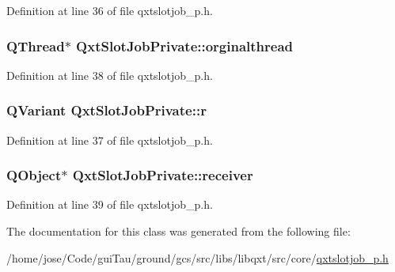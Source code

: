 Definition at line 36 of file qxtslotjob\-\_\-p.\-h.

\hypertarget{class_qxt_slot_job_private_a84859f360af208bb366408fadc1f0a4a}{
\subsubsection[{orginalthread}]{\setlength{\rightskip}{0pt plus 5cm}Q\-Thread$\ast$ Qxt\-Slot\-Job\-Private\-::orginalthread}}\label{class_qxt_slot_job_private_a84859f360af208bb366408fadc1f0a4a}


Definition at line 38 of file qxtslotjob\-\_\-p.\-h.

\hypertarget{class_qxt_slot_job_private_a39930b4d6454334df4d35a36727cf7c5}{
\subsubsection[{r}]{\setlength{\rightskip}{0pt plus 5cm}Q\-Variant Qxt\-Slot\-Job\-Private\-::r}}\label{class_qxt_slot_job_private_a39930b4d6454334df4d35a36727cf7c5}


Definition at line 37 of file qxtslotjob\-\_\-p.\-h.

\hypertarget{class_qxt_slot_job_private_a9b3127524a9fd9fe6802b820a5cef49d}{
\subsubsection[{receiver}]{\setlength{\rightskip}{0pt plus 5cm}Q\-Object$\ast$ Qxt\-Slot\-Job\-Private\-::receiver}}\label{class_qxt_slot_job_private_a9b3127524a9fd9fe6802b820a5cef49d}


Definition at line 39 of file qxtslotjob\-\_\-p.\-h.



The documentation for this class was generated from the following file\-:\begin{DoxyCompactItemize}
\item 
/home/jose/\-Code/gui\-Tau/ground/gcs/src/libs/libqxt/src/core/\hyperlink{qxtslotjob__p_8h}{qxtslotjob\-\_\-p.\-h}\end{DoxyCompactItemize}
